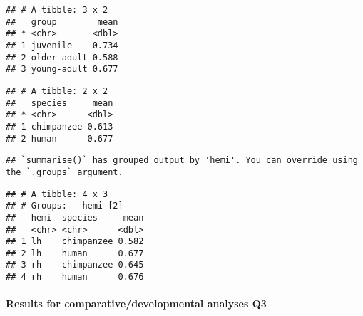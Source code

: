 \documentclass[
]{article}
\newenvironment{Shaded}{\begin{snugshade}}{\end{snugshade}}
\newcommand{\CommentTok}[1]{\textcolor[rgb]{0.56,0.35,0.01}{\textit{#1}}}
\newcommand{\DataTypeTok}[1]{\textcolor[rgb]{0.13,0.29,0.53}{#1}}
\newcommand{\KeywordTok}[1]{\textcolor[rgb]{0.13,0.29,0.53}{\textbf{#1}}}
\newcommand{\NormalTok}[1]{#1}
\newcommand{\OperatorTok}[1]{\textcolor[rgb]{0.81,0.36,0.00}{\textbf{#1}}}
\newcommand{\StringTok}[1]{\textcolor[rgb]{0.31,0.60,0.02}{#1}}
\begin{document}
\begin{verbatim}
## # A tibble: 3 x 2
##   group        mean
## * <chr>       <dbl>
## 1 juvenile    0.734
## 2 older-adult 0.588
## 3 young-adult 0.677
\end{verbatim}

\begin{Shaded}
\end{Shaded}

\begin{verbatim}
## # A tibble: 2 x 2
##   species     mean
## * <chr>      <dbl>
## 1 chimpanzee 0.613
## 2 human      0.677
\end{verbatim}

\begin{Shaded}
\end{Shaded}

\begin{verbatim}
## `summarise()` has grouped output by 'hemi'. You can override using the `.groups` argument.
\end{verbatim}

\begin{verbatim}
## # A tibble: 4 x 3
## # Groups:   hemi [2]
##   hemi  species     mean
##   <chr> <chr>      <dbl>
## 1 lh    chimpanzee 0.582
## 2 lh    human      0.677
## 3 rh    chimpanzee 0.645
## 4 rh    human      0.676
\end{verbatim}

\hypertarget{results-for-comparativedevelopmental-analyses-q3}{%
\paragraph{Results for comparative/developmental analyses
Q3}\label{results-for-comparativedevelopmental-analyses-q3}}
\end{document}
